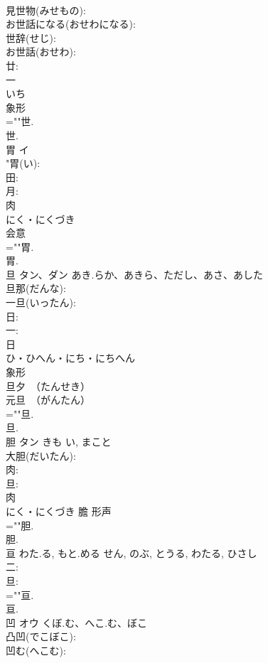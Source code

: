 \documentclass[8pt]{extreport}
\begin{document}
\begin{CJK}{UTF8}{min}
\\	見世物(みせもの): 
\\	お世話になる(おせわになる): 
\\	世辞(せじ): 
\\	お世話(おせわ): 
\\	廿: 
\\	一	
\\	いち	
\\	象形 
\\	=""世.
\\	世.
\\	胃	イ			
\\	"胃(い): 
\\	田: 
\\	月: 
\\	肉	
\\	にく・にくづき	
\\	会意 
\\	=""胃.
\\	胃.
\\	旦	タン、ダン	あき.らか、あきら、ただし、あさ、あした		
\\	旦那(だんな): 
\\	一旦(いったん): 
\\	日: 
\\	一: 
\\	日	
\\	ひ・ひへん・にち・にちへん	
\\	象形 
\\	旦夕　（たんせき） 
\\	元旦　（がんたん） 
\\	=""旦.
\\	旦.
\\	胆	タン	きも	い, まこと	
\\	大胆(だいたん): 
\\	肉: 
\\	旦: 
\\	肉	
\\	にく・にくづき	膽	形声 
\\	=""胆.
\\	胆.
\\	亘		わた.る, もと.める	せん, のぶ, とうる, わたる, ひさし			
\\	二: 
\\	旦: 
\\	=""亘.
\\	亘.
\\	凹	オウ	くぼ.む、へこ.む、ぼこ		
\\	凸凹(でこぼこ): 
\\	凹む(へこむ): 

\end{CJK}
\end{document}
